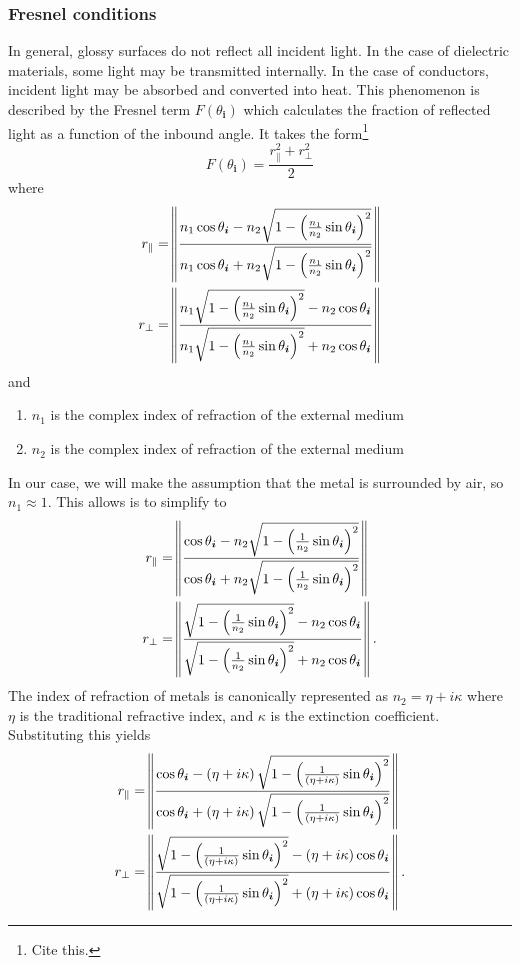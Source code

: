 \documentclass[12pt]{article}
\begin{document}
\subsubsection{Fresnel conditions}

In general, glossy surfaces do not reflect all incident light.
In the case of dielectric materials, some light may be transmitted internally.
In the case of conductors, incident light may be absorbed and converted into heat.
This phenomenon is described by the Fresnel term \(F(\theta_{\bm i})\) which calculates the fraction of reflected light as a function of the inbound angle.
It takes the form\footnote{Cite this.}
\[F(\theta_{\bm i}) = \frac{r_{\parallel}^2 + r_{\perp}^2}{2}\]
where
\begin{align*}
  r_{\parallel} &= \norm{\frac{n_1 \cos \theta_{\bm i} - n_2 \sqrt{1 - \del{\frac{n_1}{n_2}\sin \theta_{\bm i}}^2}}{n_1 \cos \theta_{\bm i} + n_2 \sqrt{1 - \del{\frac{n_1}{n_2}\sin \theta_{\bm i}}^2}}}\\
  r_{\perp} &= \norm{\frac{n_1 \sqrt{1 - \del{\frac{n_1}{n_2}\sin \theta_{\bm i}}^2} - n_2\cos \theta_{\bm i}}{n_1 \sqrt{1 - \del{\frac{n_1}{n_2}\sin \theta_{\bm i}}^2} + n_2 \cos \theta_{\bm i}}}
\end{align*}
and
\begin{enumerate}
\item \(n_1\) is the complex index of refraction of the external medium
\item \(n_2\) is the complex index of refraction of the external medium
\end{enumerate}
In our case, we will make the assumption that the metal is surrounded by air, so \(n_1 \approx 1\).
This allows is to simplify to
\begin{align*}
  r_{\parallel} &= \norm{\frac{\cos \theta_{\bm i} - n_2 \sqrt{1 - \del{\frac{1}{n_2}\sin \theta_{\bm i}}^2}}{\cos \theta_{\bm i} + n_2 \sqrt{1 - \del{\frac{1}{n_2}\sin \theta_{\bm i}}^2}}}\\
  r_{\perp} &= \norm{\frac{\sqrt{1 - \del{\frac{1}{n_2}\sin \theta_{\bm i}}^2} - n_2\cos \theta_{\bm i}}{\sqrt{1 - \del{\frac{1}{n_2}\sin \theta_{\bm i}}^2} + n_2 \cos \theta_{\bm i}}}.
\end{align*}
The index of refraction of metals is canonically represented as \(n_2 = \eta + i\kappa\) where \(\eta\) is the traditional refractive index, and \(\kappa\) is the extinction coefficient.
Substituting this yields
\begin{align*}
  r_{\parallel} &= \norm{\frac{\cos \theta_{\bm i} - \del{\eta + i\kappa} \sqrt{1 - \del{\frac{1}{\del{\eta + i\kappa}}\sin \theta_{\bm i}}^2}}{\cos \theta_{\bm i} + \del{\eta + i\kappa} \sqrt{1 - \del{\frac{1}{\del{\eta + i\kappa}}\sin \theta_{\bm i}}^2}}}\\
  r_{\perp} &= \norm{\frac{\sqrt{1 - \del{\frac{1}{\del{\eta + i\kappa}}\sin \theta_{\bm i}}^2} - \del{\eta + i\kappa}\cos \theta_{\bm i}}{\sqrt{1 - \del{\frac{1}{\del{\eta + i\kappa}}\sin \theta_{\bm i}}^2} + \del{\eta + i\kappa} \cos \theta_{\bm i}}}.
\end{align*}
\end{document}
